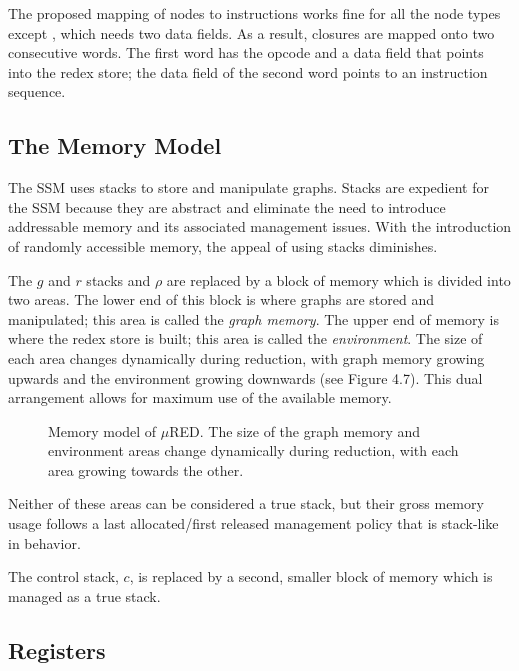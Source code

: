 The proposed mapping of nodes to instructions works fine for all the node types except
, which needs two data fields. As a result, closures are mapped onto
two consecutive words. The first word has the opcode  and a data field
that points into the redex store; the data field of the second word points to an
instruction sequence.

\subsection{The Memory Model}

The SSM uses stacks to store and manipulate graphs. Stacks are expedient for the SSM because they are abstract and eliminate the need to introduce addressable memory and its associated management issues. With the introduction of randomly accessible memory, the appeal of using stacks diminishes.

The \(g\) and \(r\) stacks and \(\rho\) are replaced by a block of memory which is divided into two areas. The lower end of this block is where graphs are stored and manipulated; this area is called the \emph{graph memory}. The upper end of memory is where the redex store is built; this area is called the \emph{environment}. The size of each area changes dynamically during reduction, with graph memory growing upwards and the environment growing downwards (see Figure 4.7). This dual arrangement allows for maximum use of the available memory.

\begin{figure}[htbp]
\centering

\caption[The \(\mu\)RED memory model]{Memory model of \(\mu\)RED. The size of the graph memory and environment areas change dynamically during reduction, with each area growing towards the other.}
\end{figure}

Neither of these areas can be considered a true stack, but their gross memory usage follows a last allocated/first released management policy that is stack-like in behavior.

The control stack, \(c\), is replaced by a second, smaller block of memory which is managed as a true stack.


\subsection{Registers}


